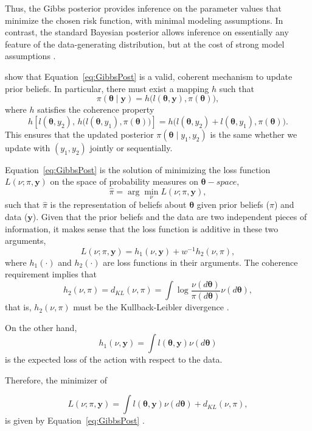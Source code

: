 Thus, the Gibbs posterior provides inference on the parameter values that minimize the chosen risk function, with minimal modeling assumptions. In contrast, the standard Bayesian posterior allows inference on essentially any feature of the data-generating distribution, but at the cost of strong model assumptions \cite{Syring2019}.

\cite{bissiri2016general} show that Equation~\ref{eq:GibbsPost} is a valid, coherent mechanism to update prior beliefs. In particular, there must exist a mapping $h$ such that
\[
\pi(\boldsymbol{\theta}\mid \mathbf{y}) = h\!\big(l(\boldsymbol{\theta},\mathbf{y}),\pi(\boldsymbol{\theta})\big),
\]
where $h$ satisfies the coherence property
\[
h\!\left[l(\boldsymbol{\theta},y_2),\,h\!\big(l(\boldsymbol{\theta},y_1),\pi(\boldsymbol{\theta})\big)\right]
= h\!\big(l(\boldsymbol{\theta},y_2)+l(\boldsymbol{\theta},y_1),\pi(\boldsymbol{\theta})\big).
\]
This ensures that the updated posterior $\pi(\boldsymbol{\theta}\mid y_1,y_2)$ is the same whether we update with $(y_1,y_2)$ jointly or sequentially.

Equation~\ref{eq:GibbsPost} is the solution of minimizing the loss function $L(\nu;\pi,\mathbf{y})$ on the space of probability measures on $\mathbf{\theta}-space$,
\[
\hat{\pi}=\arg\min_{\nu} L(\nu;\pi,\mathbf{y}),
\]
such that $\hat{\pi}$ is the representation of beliefs about $\boldsymbol{\theta}$ given prior beliefs ($\pi$) and data ($\mathbf{y}$). Given that the prior beliefs and the data are two independent pieces of information, it makes sense that the loss function is additive in these two arguments, 
\[
L(\nu;\pi,\mathbf{y})=h_1(\nu,\mathbf{y})+w^{-1}h_2(\nu,\pi),
\] 
where $h_1(\cdot)$ and $h_2(\cdot)$ are loss functions in their arguments.
The coherence requirement implies that
\[
h_2(\nu,\pi)=d_{KL}(\nu,\pi)=\int \log\frac{\nu(d\boldsymbol{\theta})}{\pi(d\boldsymbol{\theta})} \nu(d\boldsymbol{\theta}),
\]
that is, $h_2(\nu,\pi)$ must be the Kullback-Leibler divergence \cite{bissiri2016general}.

On the other hand, 
\[
h_1(\nu,\mathbf{y})=\int l(\boldsymbol{\theta},\mathbf{y})\nu(d\boldsymbol{\theta})
\]  
is the expected loss of the action with respect to the data.

Therefore, the minimizer of

\[
L(\nu;\pi,\mathbf{y})=\int l(\boldsymbol{\theta},\mathbf{y})\nu(d\boldsymbol{\theta})+d_{KL}(\nu,\pi),
\] 
is given by Equation~\ref{eq:GibbsPost} \cite{Zhang2006KLentropy,Jiang2008,bissiri2016general}.

